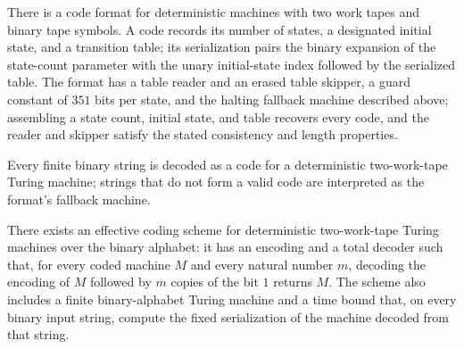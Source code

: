 \begin{definition}
\label{Turing.twoTapeFormat}
\leanok
{}
There is a code format for deterministic machines with two work tapes and binary tape
symbols. A code records its number of states, a designated initial state, and a
transition table; its serialization pairs the binary expansion of the state-count
parameter with the unary initial-state index followed by the serialized table. The
format has a table reader and an erased table skipper, a guard constant of $351$ bits
per state, and the halting fallback machine described above; assembling a state count,
initial state, and table recovers every code, and the reader and skipper satisfy the
stated consistency and length properties.
\end{definition}

\begin{definition}
\label{Turing.zfBDecode}
\leanok
{}
Every finite binary string is decoded as a code for a deterministic two-work-tape Turing
machine; strings that do not form a valid code are interpreted as the format's fallback
machine.
\end{definition}

\begin{theorem}
\label{Turing.exists_effectiveMachineCode2}
\leanok
{}
There exists an effective coding scheme for deterministic two-work-tape Turing machines
over the binary alphabet: it has an encoding and a total decoder such that, for every
coded machine $M$ and every natural number $m$, decoding the encoding of $M$ followed by
$m$ copies of the bit $1$ returns $M$. The scheme also includes a finite binary-alphabet
Turing machine and a time bound that, on every binary input string, compute the fixed
serialization of the machine decoded from that string.
\end{theorem}

